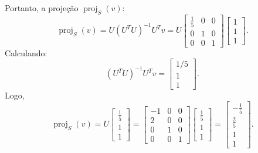 \begin{resolution}
\begin{enumerate}[label=\alph*)]
          Portanto, a projeção \( \operatorname{proj}_S(v) \):
          \[
            \operatorname{proj}_S(v) = U (U^T U)^{-1} U^T v = U \begin{bmatrix}
              \frac{1}{5} & 0 & 0 \\
              0           & 1 & 0 \\
              0           & 0 & 1
            \end{bmatrix} \begin{bmatrix}
              1 \\ 1 \\ 1
            \end{bmatrix}.
          \]
          Calculando:
          \[
            (U^T U)^{-1} U^T v = \begin{bmatrix}
              1/5 \\ 1 \\ 1
            \end{bmatrix}.
          \]
          Logo,
          \[
            \operatorname{proj}_S(v) = U \begin{bmatrix}
              \frac{1}{5} \\ 1 \\ 1
            \end{bmatrix} =
            \begin{bmatrix}
              -1 & 0 & 0 \\
              2  & 0 & 0 \\
              0  & 1 & 0 \\
              0  & 0 & 1
            \end{bmatrix}
            \begin{bmatrix}
              \frac{1}{5} \\ 1 \\ 1
            \end{bmatrix} =
            \begin{bmatrix}
              -\frac{1}{5} \\[8pt] \frac{2}{5} \\[8pt] 1 \\ 1
            \end{bmatrix}.
          \]
  \end{enumerate}
\end{resolution}

